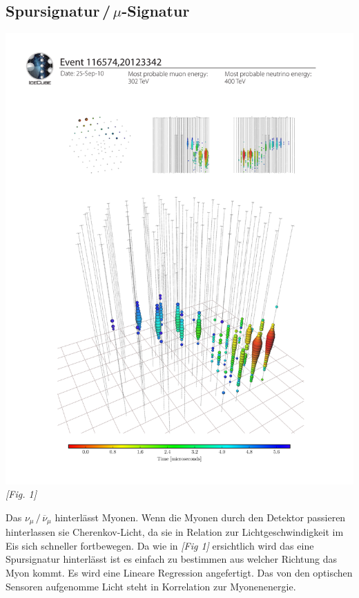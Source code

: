 \subsection{Spursignatur\,/\,$\mu$-Signatur}
\begin{center}
    \includegraphics[scale=0.43]{images/track.png} \\
    \textit{[Fig. 1]}
\end{center}
Das $\nu_\mu \,/\, \overline{\nu}_\mu$ hinterlässt Myonen. Wenn die Myonen durch den Detektor passieren
hinterlassen sie Cherenkov-Licht, da sie in Relation zur Lichtgeschwindigkeit im Eis sich schneller fortbewegen.
Da wie in \textit{[Fig 1]} ersichtlich wird das eine Spursignatur hinterlässt ist es einfach zu bestimmen aus
welcher Richtung das Myon kommt. Es wird eine Lineare Regression angefertigt. Das von den optischen Sensoren aufgenomme
Licht steht in Korrelation zur Myonenenergie.\cite{Halzen2012} \cite{Martinez2016}
\newpage

